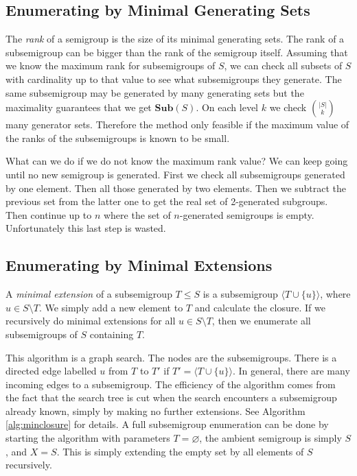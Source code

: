 \documentclass{amsart}
\newcommand{\Sub}{\mathbf{Sub}}
\theoremstyle{plain}
\theoremstyle{definition}
\begin{document}
\subsection{Enumerating by Minimal Generating Sets}
\label{sec:mingen}
The \emph{rank} of a semigroup is the size of its  minimal generating sets.
The rank of a subsemigroup can be bigger than the rank of the semigroup itself. 
Assuming that we know the maximum rank for subsemigroups of $S$, we can check all subsets of $S$ with cardinality up to that value to see what subsemigroups they generate.
The same subsemigroup may be generated by many generating sets but the maximality guarantees that we get $\Sub(S)$.
On each level $k$ we check $\binom{|S|}{k}$ many generator sets.
Therefore the method only feasible if the maximum value of the ranks of the subsemigroups is known to be small. 

What can we do if we do not know the maximum rank value?
We can keep going until no new semigroup is generated.
First we check all subsemigroups generated by one element.
Then all those generated by two elements.
Then we subtract the previous set from the latter one to get the real set of 2-generated subgroups.
Then continue up to $n$ where the set of $n$-generated semigroups is empty.
Unfortunately this last step is wasted.
\subsection{Enumerating by Minimal Extensions}
\label{sec:minext}

A \emph{minimal extension} of a subsemigroup $T\leq S$ is a subsemigroup $\langle T\cup\{u\}\rangle$, where $u\in S\setminus T$.
We simply add a new element to $T$ and calculate the closure.
If we recursively do minimal extensions for all $u\in S\setminus T$, then we enumerate all subsemigroups of $S$ containing $T$.

This algorithm is a graph search.
The nodes are the subsemigroups.
There is a directed edge labelled $u$ from $T$ to $T'$ if $T'=\langle T\cup\{u\}\rangle$.
In general, there are many incoming edges to a subsemigroup.
The efficiency of the algorithm  comes from the fact that the search tree is cut when the search encounters a subsemigroup already known, simply by making no further extensions.
See Algorithm \ref{alg:minclosure} for details.
A full subsemigroup enumeration can be done by starting the algorithm with parameters $T=\varnothing$, the ambient semigroup is simply $S$, and  $X=S$.
This is simply extending the empty set by all elements of $S$ recursively.
\end{document}
